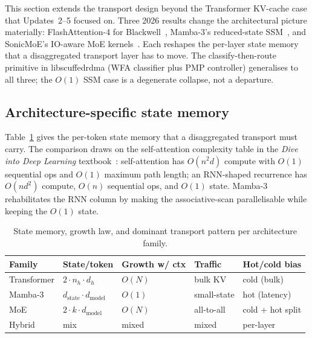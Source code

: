 \documentclass[11pt,letterpaper]{article}
\theoremstyle{definition}
\begin{document}
This section extends the transport design beyond the Transformer
KV-cache case that Updates~2--5 focused on. Three 2026 results
change the architectural picture materially: FlashAttention-4 for
Blackwell~\cite{zadouri2026flashattention4}, Mamba-3's reduced-state
SSM~\cite{lahoti2026mamba3}, and SonicMoE's IO-aware MoE
kernels~\cite{guo2026sonicmoe}. Each reshapes the per-layer state
memory that a disaggregated transport layer has to move. The
classify-then-route primitive in libscuffedrdma (WFA classifier plus
PMP controller) generalises to all three; the $O(1)$ SSM case is a
degenerate collapse, not a departure.

\subsection{Architecture-specific state memory}
\label{sec:arch-mem}

Table~\ref{tab:arch-mem-budget} gives the per-token state memory
that a disaggregated transport must carry. The comparison draws on
the self-attention complexity table in the \emph{Dive into Deep
Learning} textbook~\cite{zhang2023d2l}: self-attention has
$O(n^2 d)$ compute with $O(1)$ sequential ops and $O(1)$ maximum
path length; an RNN-shaped recurrence has $O(n d^2)$ compute,
$O(n)$ sequential ops, and $O(1)$ state. Mamba-3 rehabilitates the
RNN column by making the associative-scan parallelisable while
keeping the $O(1)$ state.

\begin{table}[htbp]
\centering
\caption{State memory, growth law, and dominant transport pattern
per architecture family.}
\label{tab:arch-mem-budget}
\small
\begin{tabular}{lllll}
\toprule
Family        & State/token             & Growth w/ ctx & Traffic     & Hot/cold bias \\
\midrule
Transformer   & $2 \cdot n_h \cdot d_h$ & $O(N)$        & bulk KV     & cold (bulk)   \\
Mamba-3       & $d_{\text{state}} \cdot d_{\text{model}}$ & $O(1)$  & small-state & hot (latency) \\
MoE           & $2 \cdot k \cdot d_{\text{model}}$ & $O(N)$ & all-to-all & cold + hot split \\
Hybrid        & mix                     & mixed         & mixed       & per-layer     \\
\bottomrule
\end{tabular}
\end{table}
\end{document}
